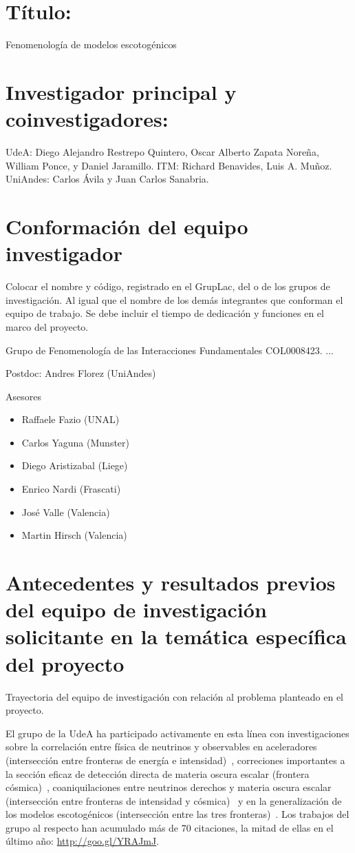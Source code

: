 \section{Título:}
Fenomenología de modelos escotogénicos
\section{Investigador principal y coinvestigadores: }
UdeA: Diego Alejandro Restrepo Quintero,
Oscar Alberto Zapata Noreña, William Ponce, y Daniel Jaramillo. 
ITM: Richard Benavides, Luis A. Muñoz. 
UniAndes: Carlos Ávila y  Juan Carlos Sanabria.

\section{Conformación del equipo investigador }
\begin{colciencias}
Colocar el nombre y código, registrado en el GrupLac, del o de los grupos de investigación. Al igual que el nombre de los demás integrantes que conforman el equipo de trabajo. Se debe incluir el tiempo de dedicación y funciones en el marco del proyecto.
\end{colciencias}
Grupo de Fenomenología de las Interacciones Fundamentales COL0008423.
...

Postdoc: Andres Florez (UniAndes)


Asesores
\begin{itemize}
\item Raffaele Fazio (UNAL)
\item Carlos Yaguna (Munster)
\item Diego Aristizabal (Liege)
\item Enrico Nardi (Frascati)
\item José Valle (Valencia)
\item Martin Hirsch (Valencia)
\end{itemize}


\section{Antecedentes y resultados previos del equipo de investigación solicitante en la temática específica del proyecto}
\begin{colciencias}
Trayectoria del equipo de investigación con relación al problema planteado en el proyecto.
\end{colciencias}
El grupo de la UdeA ha participado activamente en esta línea con
investigaciones sobre la correlación entre física de neutrinos y
observables en aceleradores (intersección entre fronteras de energía e
intensidad)~\cite{Restrepo:2013aga}, correciones importantes a la sección eficaz de
detección directa de materia oscura escalar (frontera
cósmica)~\cite{Klasen:2013btp}, coaniquilaciones entre neutrinos derechos y
materia oscura escalar (intersección entre fronteras de intensidad y
cósmica)~\cite{Klasen:2013jpa} y en la generalización de los modelos escotogénicos
(intersección entre las tres fronteras)~\cite{Restrepo:2013aga}. Los
trabajos del grupo al respecto han acumulado más de 70 citaciones, la
mitad de ellas en el último año: \url{http://goo.gl/YRAJmJ}.


